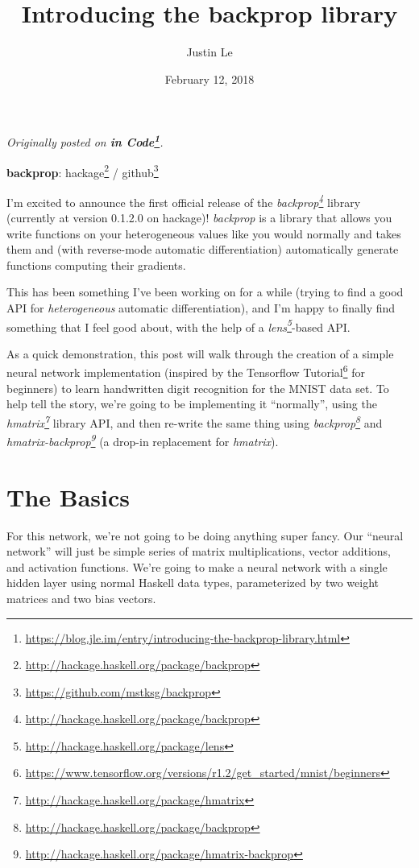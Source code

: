 \documentclass[]{article}
\title{Introducing the backprop library}
\author{Justin Le}
\date{February 12, 2018}
\renewcommand{\href}[2]{#2\footnote{\url{#1}}}
\begin{document}
\maketitle

\emph{Originally posted on
\textbf{\href{https://blog.jle.im/entry/introducing-the-backprop-library.html}{in
Code}}.}

\textbf{backprop}: \href{http://hackage.haskell.org/package/backprop}{hackage} /
\href{https://github.com/mstksg/backprop}{github}

I'm excited to announce the first official release of the
\emph{\href{http://hackage.haskell.org/package/backprop}{backprop}} library
(currently at version 0.1.2.0 on hackage)! \emph{backprop} is a library that
allows you write functions on your heterogeneous values like you would normally
and takes them and (with reverse-mode automatic differentiation) automatically
generate functions computing their gradients.

This has been something I've been working on for a while (trying to find a good
API for \emph{heterogeneous} automatic differentiation), and I'm happy to
finally find something that I feel good about, with the help of a
\emph{\href{http://hackage.haskell.org/package/lens}{lens}}-based API.

As a quick demonstration, this post will walk through the creation of a simple
neural network implementation (inspired by the
\href{https://www.tensorflow.org/versions/r1.2/get_started/mnist/beginners}{Tensorflow
Tutorial} for beginners) to learn handwritten digit recognition for the MNIST
data set. To help tell the story, we're going to be implementing it
``normally'', using the
\emph{\href{http://hackage.haskell.org/package/hmatrix}{hmatrix}} library API,
and then re-write the same thing using
\emph{\href{http://hackage.haskell.org/package/backprop}{backprop}} and
\emph{\href{http://hackage.haskell.org/package/hmatrix-backprop}{hmatrix-backprop}}
(a drop-in replacement for \emph{hmatrix}).

\hypertarget{the-basics}{%
\section{The Basics}\label{the-basics}}

For this network, we're not going to be doing anything super fancy. Our ``neural
network'' will just be simple series of matrix multiplications, vector
additions, and activation functions. We're going to make a neural network with a
single hidden layer using normal Haskell data types, parameterized by two weight
matrices and two bias vectors.
\end{document}
